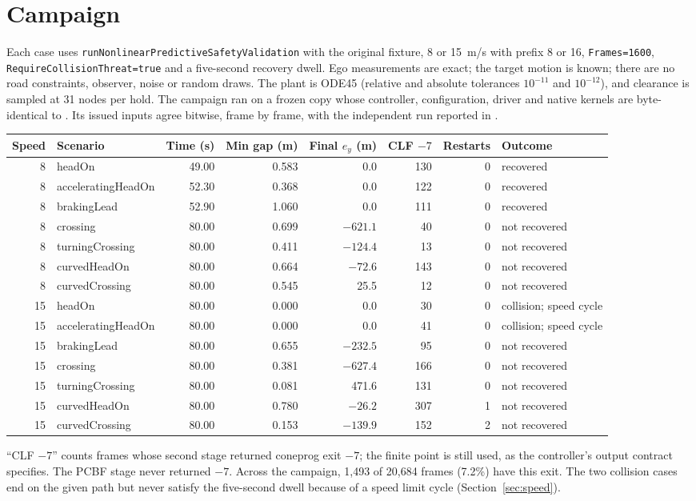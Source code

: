 \documentclass[11pt]{article}
\begin{document}
\section{Campaign}
Each case uses \texttt{runNonlinearPredictiveSafetyValidation} with the
original fixture, 8 or 15~m/s with prefix 8 or 16, \texttt{Frames=1600},
\texttt{RequireCollisionThreat=true} and a five-second recovery dwell. Ego
measurements are exact; the target motion is known; there are no road
constraints, observer, noise or random draws. The plant is ODE45 (relative and
absolute tolerances $10^{-11}$ and $10^{-12}$), and clearance is sampled at 31
nodes per hold. The campaign ran on a frozen copy whose controller,
configuration, driver and native kernels are byte-identical to
. Its issued inputs agree bitwise, frame by frame, with the
independent run reported in .
\begin{center}\footnotesize
\begin{tabular}{rlrrrrrl}
\toprule
Speed & Scenario & Time (s) & Min gap (m) & Final $e_y$ (m) & CLF $-7$ & Restarts & Outcome\\
\midrule
8 & headOn & 49.00 & 0.583 & 0.0 & 130 & 0 & recovered\\
8 & acceleratingHeadOn & 52.30 & 0.368 & 0.0 & 122 & 0 & recovered\\
8 & brakingLead & 52.90 & 1.060 & 0.0 & 111 & 0 & recovered\\
8 & crossing & 80.00 & 0.699 & $-621.1$ & 40 & 0 & not recovered\\
8 & turningCrossing & 80.00 & 0.411 & $-124.4$ & 13 & 0 & not recovered\\
8 & curvedHeadOn & 80.00 & 0.664 & $-72.6$ & 143 & 0 & not recovered\\
8 & curvedCrossing & 80.00 & 0.545 & 25.5 & 12 & 0 & not recovered\\
15 & headOn & 80.00 & 0.000 & 0.0 & 30 & 0 & collision; speed cycle\\
15 & acceleratingHeadOn & 80.00 & 0.000 & 0.0 & 41 & 0 & collision; speed cycle\\
15 & brakingLead & 80.00 & 0.655 & $-232.5$ & 95 & 0 & not recovered\\
15 & crossing & 80.00 & 0.381 & $-627.4$ & 166 & 0 & not recovered\\
15 & turningCrossing & 80.00 & 0.081 & 471.6 & 131 & 0 & not recovered\\
15 & curvedHeadOn & 80.00 & 0.780 & $-26.2$ & 307 & 1 & not recovered\\
15 & curvedCrossing & 80.00 & 0.153 & $-139.9$ & 152 & 2 & not recovered\\
\bottomrule
\end{tabular}\end{center}
``CLF $-7$'' counts frames whose second stage returned coneprog exit $-7$; the
finite point is still used, as the controller's output contract specifies.
The PCBF stage never returned $-7$. Across the campaign, 1{,}493 of 20{,}684
frames (7.2\%) have this exit. The two collision cases end on the given path
but never satisfy the five-second dwell because of a speed limit cycle
(Section~\ref{sec:speed}).
\end{document}

